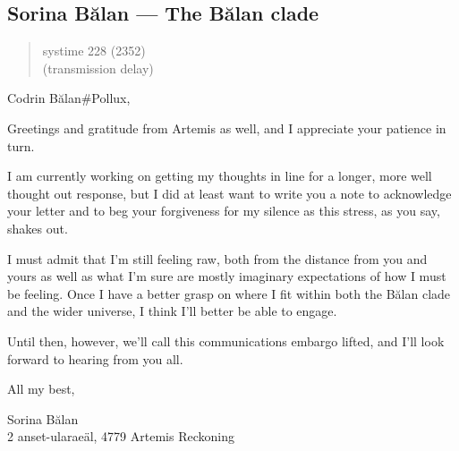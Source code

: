 \hypertarget{sorina-bux103lan-the-bux103lan-clade}{%
\subsection{Sorina Bălan — The Bălan clade}\label{sorina-bux103lan-the-bux103lan-clade}}

\begin{quote}
systime 228 (2352)\\
(transmission delay)
\end{quote}

Codrin Bălan\#Pollux,

Greetings and gratitude from Artemis as well, and I appreciate your patience in turn.

I am currently working on getting my thoughts in line for a longer, more well thought out response, but I did at least want to write you a note to acknowledge your letter and to beg your forgiveness for my silence as this stress, as you say, shakes out.

I must admit that I'm still feeling raw, both from the distance from you and yours as well as what I'm sure are mostly imaginary expectations of how I must be feeling. Once I have a better grasp on where I fit within both the Bălan clade and the wider universe, I think I'll better be able to engage.

Until then, however, we'll call this communications embargo lifted, and I'll look forward to hearing from you all.

All my best,

Sorina Bălan\\
2 anset-ularaeäl, 4779 Artemis Reckoning
